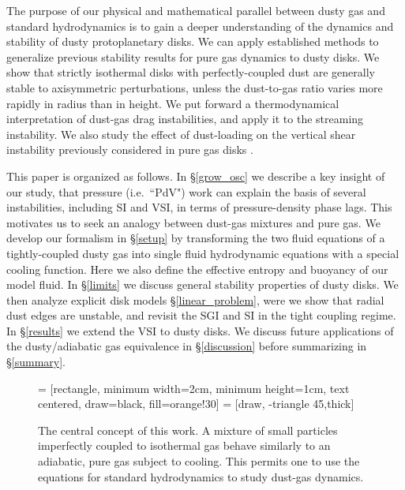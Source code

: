 \documentclass[iop, numberedappendix]{emulateapj}
\begin{document}

The purpose of our physical and mathematical parallel between
dusty gas and standard hydrodynamics is to gain a deeper understanding of the dynamics
and stability of dusty protoplanetary disks.  
We can apply established methods to generalize previous stability 
results for pure gas dynamics to dusty disks.  
We show that strictly isothermal disks with 
perfectly-coupled dust are generally 
stable to axisymmetric perturbations, unless the 
dust-to-gas ratio varies more rapidly in radius than in height.  
We put forward a thermodynamical interpretation of 
dust-gas drag instabilities, and apply it to the streaming instability.   
We also study the effect of dust-loading on the vertical shear
instability previously considered in pure gas disks
\citep[VSI,][]{nelson13,lin15,barker15}.  


This paper is organized as follows.  
In \S\ref{grow_osc} we describe a key insight of our study, that
pressure (i.e.\ ``PdV")  work {can} explain the basis of several
instabilities, including SI and VSI, in terms of 
pressure-density phase lags. { This motivates us to seek an 
  analogy between dust-gas mixtures and pure gas.}    
We develop our formalism in \S\ref{setup} by transforming the
two fluid equations of a tightly-coupled dusty gas into single fluid
hydrodynamic equations with a special cooling function.  Here we also
define the effective entropy and buoyancy of our model fluid. 
In \S\ref{limits} we discuss general stability properties of dusty
disks. We then analyze explicit disk models 
\S\ref{linear_problem}, were we show that radial dust edges are unstable,
and revisit the SGI and SI in the tight 
coupling regime. In \S\ref{results} we 
extend the VSI to dusty disks. We   
discuss future applications of the dusty/adiabatic gas equivalence in 
\S\ref{discussion} before summarizing in \S\ref{summary}. 


\begin{figure}
 = [rectangle, minimum width=2cm, minimum height=1cm, text centered, draw=black, fill=orange!30]
   = [draw, -triangle 45,thick]  
  \begin{center}
 \end{center}
\caption{The central concept of this work. A mixture of small particles
  imperfectly coupled to isothermal gas behave similarly to an adiabatic, pure gas
  subject to cooling.  This
  permits one to use the equations for standard hydrodynamics to study
  dust-gas dynamics. \label{concept_chart}}
\end{figure}
\end{document}
